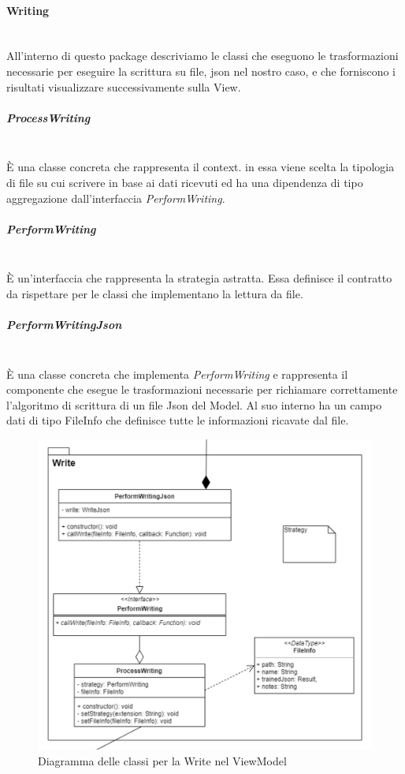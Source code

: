 		\paragraph*{Writing} \mbox{} \\[1mm]
		All'interno di questo package descriviamo le classi che eseguono le trasformazioni necessarie per eseguire la scrittura su file, json nel nostro caso, e che forniscono i risultati visualizzare successivamente sulla View.
		\subparagraph*{ProcessWriting} \mbox{} \\[1mm]
		È una classe concreta che rappresenta il context. in essa viene scelta la tipologia di file su cui scrivere in base ai dati ricevuti ed ha una dipendenza di tipo aggregazione dall'interfaccia \textit{PerformWriting}.
		\subparagraph*{PerformWriting} \mbox{} \\[1mm]
		È un'interfaccia che rappresenta la strategia astratta. Essa definisce il contratto da rispettare per le classi che implementano la lettura da file.
		\subparagraph*{PerformWritingJson} \mbox{} \\[1mm]
		È una classe concreta che implementa \textit{PerformWriting} e rappresenta il componente che esegue le trasformazioni necessarie per richiamare correttamente l'algoritmo di scrittura di un file Json del Model. Al suo interno ha un campo dati di tipo FileInfo che definisce tutte le informazioni ricavate dal file.
		\mbox{}
				\begin{figure} [H]
					\includegraphics[width=\linewidth]{img/Diagrammi/ViewModel-write-app.png}
					\caption{Diagramma delle classi per la Write nel ViewModel}
				\end{figure}
		
